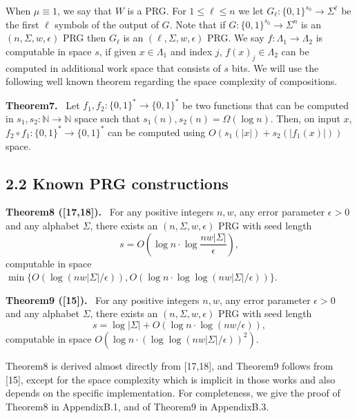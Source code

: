 \documentclass[10pt,a4paper]{article}
\newenvironment{authorclaim}[1]{\par\medskip\noindent\textbf{#1.}\ }{\par\medskip}
\begin{document}
When $\mu\equiv1$, we say that $W$ is a PRG.
For $1\le\ell\le n$ we let $G_\ell:\{0,1\}^{s_0}\to\Sigma^\ell$ be the first $\ell$ symbols of the output of $G$. Note that if $G:\{0,1\}^{s_0}\to\Sigma^n$ is an $(n,\Sigma,w,\epsilon)$ PRG then $G_\ell$ is an $(\ell,\Sigma,w,\epsilon)$ PRG.
We say $f:\Lambda_1\to\Lambda_2$ is computable in space $s$, if given $x\in\Lambda_1$ and index $j$, $f(x)_j\in\Lambda_2$ can be computed in additional work space that consists of $s$ bits. We will use the following well known theorem regarding the space complexity of compositions.
\begin{authorclaim}{Theorem7}
Let $f_1,f_2:\{0,1\}^*\to\{0,1\}^*$ be two functions that can be computed in $s_1,s_2:\mathbb N\to\mathbb N$ space such that $s_1(n),s_2(n)=\Omega(\log n)$. Then, on input $x$, $f_2\circ f_1:\{0,1\}^*\to\{0,1\}^*$ can be computed using $O(s_1(|x|)+s_2(|f_1(x)|))$ space.
\end{authorclaim}
\subsection*{2.2 Known PRG constructions}
\begin{authorclaim}{Theorem8 ([17,18])}
For any positive integers $n,w$, any error parameter $\epsilon>0$ and any alphabet $\Sigma$, there exists an $(n,\Sigma,w,\epsilon)$ PRG with seed length
\[s=O\left(\log n\cdot\log\frac{nw|\Sigma|}\epsilon\right),\]
computable in space $\min\{O(\log(nw|\Sigma|/\epsilon)),O(\log n\cdot\log\log(nw|\Sigma|/\epsilon))\}$.
\end{authorclaim}
\begin{authorclaim}{Theorem9 ([15])}
For any positive integers $n,w$, any error parameter $\epsilon>0$ and any alphabet $\Sigma$, there exists an $(n,\Sigma,w,\epsilon)$ PRG with seed length
\[s=\log|\Sigma|+O(\log n\cdot\log(nw/\epsilon)),\]
computable in space $O(\log n\cdot(\log\log(nw|\Sigma|/\epsilon))^2)$.
\end{authorclaim}
Theorem8 is derived almost directly from [17,18], and Theorem9 follows from [15], except for the space complexity which is implicit in those works and also depends on the specific implementation. For completeness, we give the proof of Theorem8 in AppendixB.1, and of Theorem9 in AppendixB.3.
\end{document}

